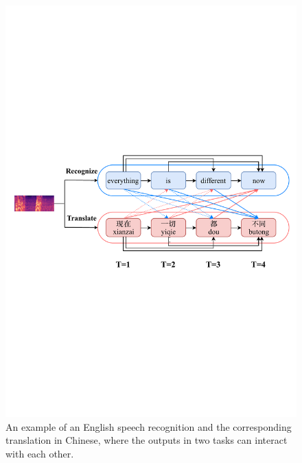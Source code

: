 \documentclass[letterpaper]{article} %
\begin{document}
\begin{figure}[t]
\centering
\includegraphics[width=\columnwidth]{example.pdf}
\caption{An example of an English speech recognition and the corresponding translation in Chinese, where the outputs in two tasks can interact with each other.}
\label{fig:example}
\end{figure}
\end{document}
